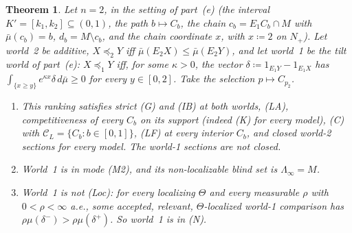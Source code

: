 \documentclass[11pt]{article}
\newtheorem{theorem}{Theorem}[section]
\theoremstyle{definition}
\theoremstyle{remark}
\newcommand{\C}{\mathcal C}
\begin{document}
\begin{theorem}\label{thm:K33}
Let $n=2$, in the setting of part~(e) (the interval $K'=[k_1,k_2]\subseteq(0,1)$, the path $b\mapsto C_b$, the chain $c_b=E_1C_b\cap M$ with $\bar\mu(c_b)=b$, $d_b=M\setminus c_b$, and the chain coordinate $x$, with $x\coloneqq2$ on $N_+$). Let world~2 be additive, $X\preceq_2Y$ iff $\bar\mu(E_2X)\le\bar\mu(E_2Y)$, and let world~1 be the tilt world of part~(e): $X\preceq_1Y$ iff, for some $\kappa>0$, the vector $\delta\coloneqq1_{E_1Y}-1_{E_1X}$ has $\int_{\{x\ge y\}}e^{\kappa x}\delta\,d\bar\mu\ge0$ for every $y\in[0,2]$. Take the selection $p\mapsto C_{p_2}$.
\begin{enumerate}[leftmargin=*,label=(\alph*)]
\item This ranking satisfies strict (G) and (IB) at both worlds, (LA), competitiveness of every $C_b$ on its support (indeed (K) for every model), (C) with $\C_L=\{C_b:b\in[0,1]\}$, (LF) at every interior $C_b$, and closed world-2 sections for every model. The world-1 sections are not closed.
\item World~1 is in mode (M2), and its non-localizable blind set is $\Lambda_\infty=M$.
\item World~1 is not (Loc): for every localizing $\Theta$ and every measurable $\rho$ with $0<\rho<\infty$ a.e., some accepted, relevant, $\Theta$-localized world-1 comparison has $\rho\mu(\delta^-)>\rho\mu(\delta^+)$. So world~1 is in (N).
\end{enumerate}
\end{theorem}
\end{document}
